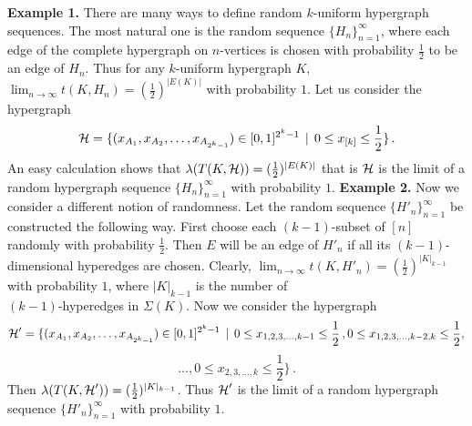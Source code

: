 \documentclass [11pt] {article}
\def\limn{\lim_{n\to\infty}}
\def\cH{\mbox{$\cal H$}}
\def\to{\rightarrow}
\begin{document}
\vskip 0.1in
\noindent
{\bf Example 1.}
There are many ways to define random $k$-uniform hypergraph
sequences. The most natural one is the random sequence $\{H_n\}^\infty_{n=1}$,
where each edge of the complete hypergraph on $n$-vertices is chosen
with probability $\frac{1}{2}$ to be an edge of $H_n$. Thus for any $k$-uniform
hypergraph $K$, $\limn t(K,H_n)=(\frac{1}{2})^{|E(K)|}$ with probability $1$.
Let us consider the hypergraph
$$\cH=\{(x_{A_1},x_{A_2},\dots,x_{A_{2^k-1}})\in [0,1]^{2^k-1}\,\mid
\,0\leq x_{[k]}\leq \frac{1}{2}\}\,.$$
An easy calculation shows that $\lambda(T(K,\cH))=(\frac{1}{2})^{|E(K)|}$
that is $\cH$ is the limit of a  random hypergraph sequence
$\{H_n\}^\infty_{n=1}$ with
probability $1$.
\vskip 0.1in
\noindent
{\bf Example 2.}
Now we consider a different notion of randomness. Let the random
sequence $\{H'_n\}^\infty_{n=1}$ be constructed the following way.
First choose each $(k-1)$-subset of $[n]$ randomly with probability
$\frac{1}{2}$. Then $E$ will be an edge of $H'_n$ if all its
$(k-1)$-dimensional hyperedges are chosen.
Clearly, $\limn t(K,H'_n)=(\frac{1}{2})^{|K|_{k-1}}$ with probability
$1$, where $|K|_{k-1}$ is the
number of \\ $(k-1)$-hyperedges in $\Sigma(K)$. Now we consider the hypergraph
$$\cH'=\{(x_{A_1},x_{A_2},\dots,x_{A_{2^k-1}})\in [0,1]^{2^k-1}\,\mid
\,0\leq x_{1,2,3,\dots,k-1}\leq \frac{1}{2}\,,
0\leq x_{1,2,3,\dots,k-2,k}\leq \frac{1}{2}, $$$$\dots,
0\leq x_{2,3,\dots,k}\leq \frac{1}{2}\}\,.$$
Then $\lambda(T(K,\cH'))=(\frac{1}{2})^{|K|_{k-1}}$.
Thus $\cH'$  is the limit of a random hypergraph sequence
$\{H'_n\}^\infty_{n=1}$ with
probability $1$.
\end{document}
